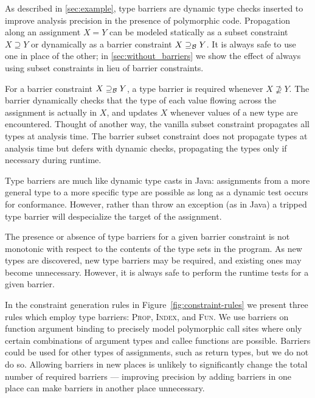 As described in \Section\ref{sec:example}, type barriers are dynamic type checks
inserted to improve analysis precision in the presence
of polymorphic code.
Propagation along an assignment $X = Y$ can be modeled
statically as a subset
constraint $X \supseteq Y$ or dynamically as a barrier constraint
$X \supseteq_\mathcal{B} Y$.
It is always safe to use one in place of the other; in \Section\ref{sec:without_barriers}
we show the effect of always using subset constraints in lieu of
barrier constraints.

For a barrier constraint $X \supseteq_\mathcal{B} Y$, a type barrier is required whenever
$X \not\supseteq Y$. The barrier dynamically checks that the type of each value
flowing across the assignment is actually in $X$, and updates $X$ whenever
values of a new type are encountered.
Thought of another way, the vanilla subset constraint propagates
all types at analysis time. The barrier subset constraint does not propagate
types at analysis time but defers with dynamic checks, propagating the types
only if necessary during runtime.

Type barriers are much like dynamic type casts in Java: assignments from a
more general type to a more specific type are possible as long as a
dynamic test occurs for conformance.
However, rather than throw an exception (as in Java) a tripped type barrier will
despecialize the target of the assignment.

The presence or absence of type barriers for a given barrier constraint is not
monotonic with respect to the contents of the type sets in the program.  As
new types are discovered, new type barriers may be required, and existing ones
may become unnecessary.  However, it is always safe to perform the runtime
tests for a given barrier.

In the constraint generation rules in Figure~\ref{fig:constraint-rules} we
present three rules which employ type barriers:
\textsc{Prop}, \textsc{Index}, and \textsc{Fun}. We use barriers on function
argument binding to precisely model polymorphic call sites where
only certain combinations of argument types and callee functions are possible.
Barriers could be used for other types of assignments, such as return types, but we do not do so.
Allowing barriers in new places is unlikely to significantly change the total
number of required barriers --- improving precision by adding barriers in one
place can make barriers in another place unnecessary.

